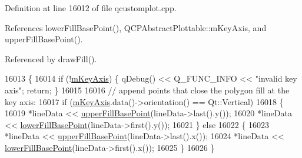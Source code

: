 Definition at line 16012 of file qcustomplot.\+cpp.



References lower\+Fill\+Base\+Point(), Q\+C\+P\+Abstract\+Plottable\+::m\+Key\+Axis, and upper\+Fill\+Base\+Point().



Referenced by draw\+Fill().


\begin{DoxyCode}
16013 \{
16014   \textcolor{keywordflow}{if} (!\hyperlink{class_q_c_p_abstract_plottable_a426f42e254d0f8ce5436a868c61a6827}{mKeyAxis}) \{ qDebug() << Q\_FUNC\_INFO << \textcolor{stringliteral}{"invalid key axis"}; \textcolor{keywordflow}{return}; \}
16015   
16016   \textcolor{comment}{// append points that close the polygon fill at the key axis:}
16017   \textcolor{keywordflow}{if} (\hyperlink{class_q_c_p_abstract_plottable_a426f42e254d0f8ce5436a868c61a6827}{mKeyAxis}.data()->orientation() == Qt::Vertical)
16018   \{
16019     *lineData << \hyperlink{class_q_c_p_graph_a363d066c179e0f46cc93c12bafb0bfba}{upperFillBasePoint}(lineData->last().y());
16020     *lineData << \hyperlink{class_q_c_p_graph_a41f982e8ceaefe6a53eb7432f26d64b6}{lowerFillBasePoint}(lineData->first().y());
16021   \} \textcolor{keywordflow}{else}
16022   \{
16023     *lineData << \hyperlink{class_q_c_p_graph_a363d066c179e0f46cc93c12bafb0bfba}{upperFillBasePoint}(lineData->last().x());
16024     *lineData << \hyperlink{class_q_c_p_graph_a41f982e8ceaefe6a53eb7432f26d64b6}{lowerFillBasePoint}(lineData->first().x());
16025   \}
16026 \}
\end{DoxyCode}


